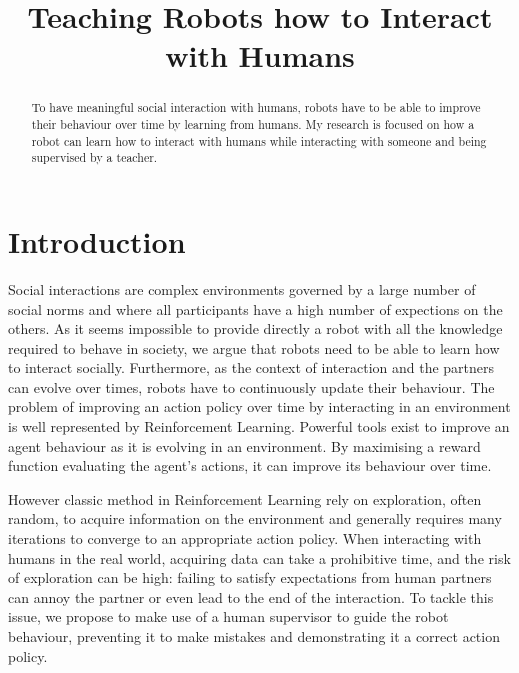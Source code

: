 \documentclass[conference]{IEEEtran}
\begin{document}
\title{Teaching Robots how to Interact with Humans}

\author{
}

\maketitle

\begin{abstract}

To have meaningful social interaction with humans, robots have to be able to improve
    their behaviour over time by learning from humans. My research is
    focused on how a robot can learn how to interact with humans while
    interacting with someone and being supervised by a teacher.

\end{abstract}

\section{Introduction}

Social interactions are complex environments governed by a large number of
social norms and where all participants have a high number of expections on the
others.  As it seems impossible to provide directly a robot with all the
knowledge required to behave in society, we argue that robots need to be able to
learn how to interact socially. Furthermore, as the context of interaction and
the partners can evolve over times, robots have to continuously update their
behaviour.  The problem of improving an action policy over time by interacting
in an environment is well represented by Reinforcement Learning. Powerful tools
exist to improve an agent behaviour as it is evolving in an environment. By
maximising a reward function evaluating the agent's actions, it can improve its
behaviour over time. 

However classic method in Reinforcement Learning rely on exploration, often
random, to acquire information on the environment and generally requires many
iterations to converge to an appropriate action policy. When interacting with
humans in the real world, acquiring data can take a prohibitive time, and the
risk of exploration can be high: failing to satisfy expectations from human
partners can annoy the partner or even lead to the end of the interaction. To
tackle this issue, we propose to make use of a human supervisor to guide the
robot behaviour, preventing it to make mistakes and demonstrating it a correct
action policy.
\end{document}
